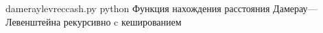 \begin{appendices}
	\chapter{}
	\label{dlrc}
	{dameraylevreccash.py} %
	{python} %
	{Функция нахождения расстояния Дамерау---Левенштейна рекурсивно c кешированием} %
\end{appendices}